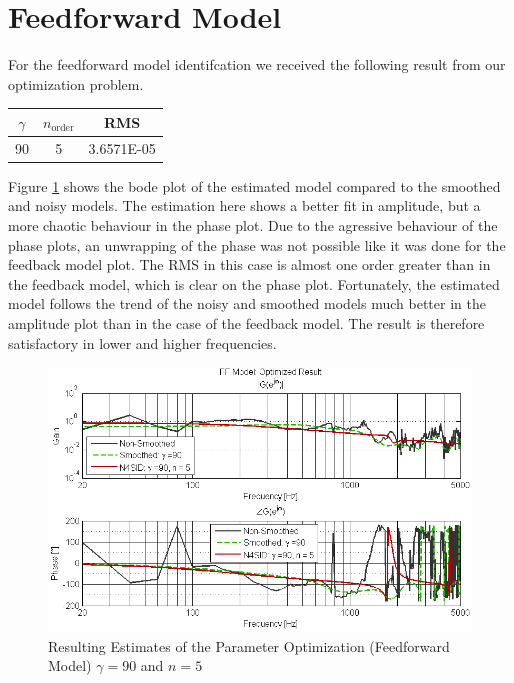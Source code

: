 \section{Feedforward Model}
For the feedforward model identifcation we received the following result from our optimization problem. 

\begin{table}[H]
\centering
\begin{tabular}{c|c|c}
$\gamma$ & $n_\text{order}$ & RMS \\ \hline
90 & 5 & 3.6571E-05 \\ 
\end{tabular}
\end{table}

Figure \ref{fig:results_FF} shows the bode plot of the estimated model compared to the smoothed and noisy models. The estimation here shows a better fit in amplitude, but a more chaotic behaviour in the phase plot. Due to the agressive behaviour of the phase plots, an unwrapping of the phase was not possible like it was done for the feedback model plot. The RMS in this case is almost one order greater than in the feedback model, which is clear on the phase plot. Fortunately, the estimated model follows the trend of the noisy and smoothed models much better in the amplitude plot than in the case of the feedback model. The result is therefore satisfactory in lower and higher frequencies.\\

\begin{figure}[h]
\centering
\includegraphics[width=1.0\textwidth]{pics/results_FF}
\caption{Resulting Estimates of the Parameter Optimization (Feedforward Model)  $\gamma = 90$ and $n = 5$}
\label{fig:results_FF}
\end{figure}

